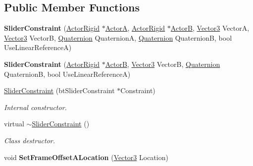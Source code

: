 \subsection*{Public Member Functions}
\begin{DoxyCompactItemize}
\item 
\hypertarget{classphys_1_1SliderConstraint_a012329e9d8125ff030c6351045f0f97b}{
{\bfseries SliderConstraint} (\hyperlink{classphys_1_1ActorRigid}{ActorRigid} $\ast$\hyperlink{classphys_1_1TypedConstraint_a0fefb80c80d433bec9942b851b2f5a8a}{ActorA}, \hyperlink{classphys_1_1ActorRigid}{ActorRigid} $\ast$\hyperlink{classphys_1_1TypedConstraint_a04d2c49698d9a161e92112dd1efc1dcd}{ActorB}, \hyperlink{classphys_1_1Vector3}{Vector3} VectorA, \hyperlink{classphys_1_1Vector3}{Vector3} VectorB, \hyperlink{classphys_1_1Quaternion}{Quaternion} QuaternionA, \hyperlink{classphys_1_1Quaternion}{Quaternion} QuaternionB, bool UseLinearReferenceA)}
\label{dc/d72/classphys_1_1SliderConstraint_a012329e9d8125ff030c6351045f0f97b}

\item 
\hypertarget{classphys_1_1SliderConstraint_a4727dc39e3ac0ab553aa6a1cff00fc4e}{
{\bfseries SliderConstraint} (\hyperlink{classphys_1_1ActorRigid}{ActorRigid} $\ast$\hyperlink{classphys_1_1TypedConstraint_a04d2c49698d9a161e92112dd1efc1dcd}{ActorB}, \hyperlink{classphys_1_1Vector3}{Vector3} VectorB, \hyperlink{classphys_1_1Quaternion}{Quaternion} QuaternionB, bool UseLinearReferenceA)}
\label{dc/d72/classphys_1_1SliderConstraint_a4727dc39e3ac0ab553aa6a1cff00fc4e}

\item 
\hyperlink{classphys_1_1SliderConstraint_a142708184f0a445edadddc4ad5ca08b5}{SliderConstraint} (btSliderConstraint $\ast$Constraint)
\begin{DoxyCompactList}\small\item\em Internal constructor. \item\end{DoxyCompactList}\item 
virtual \hyperlink{classphys_1_1SliderConstraint_a11f32500c6cb4ec89e7eb6160842ba35}{$\sim$SliderConstraint} ()
\begin{DoxyCompactList}\small\item\em Class destructor. \item\end{DoxyCompactList}\item 
\hypertarget{classphys_1_1SliderConstraint_a815265abaf184340aef505eaf82775e2}{
void {\bfseries SetFrameOffsetALocation} (\hyperlink{classphys_1_1Vector3}{Vector3} Location)}
\label{dc/d72/classphys_1_1SliderConstraint_a815265abaf184340aef505eaf82775e2}


\end{DoxyCompactItemize}
